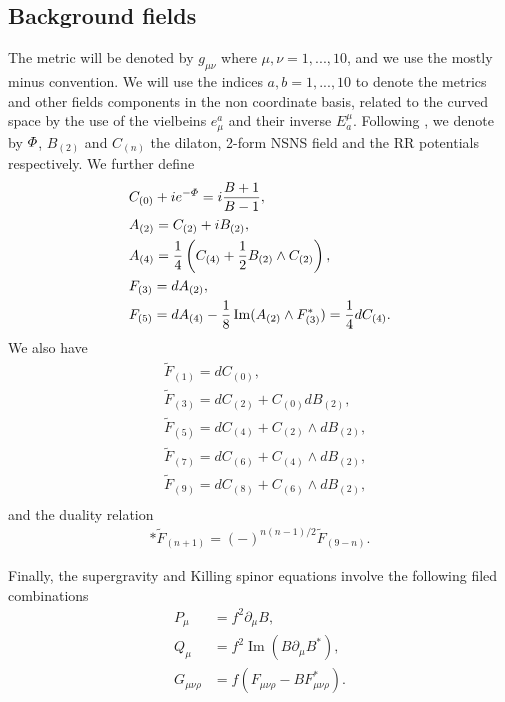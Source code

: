 \documentclass[11pt]{article}
\let\oldPhi=\Phi
\renewcommand{\Phi}{\mathnormal{\oldPhi}}
\renewcommand{\Im}{\mathop{\mathrm{Im}}}
\newcommand{\sfrac}[2]{{\textstyle\frac{#1}{#2}}}
\newcommand{\p}{\partial}\newcommand{\quarter}{\sfrac{1}{4}}
\begin{document}
\subsection{Background fields}
The metric will be denoted by $g_{\mu \nu}$ where $\mu,\nu = 1,...,10$, and we use the mostly minus convention.
We will use the indices $a,b=1,...,10$ to denote the metrics and other fields components in the non coordinate basis, related to the curved space by the use of the vielbeins $e_\mu^a$ and their inverse $E_a^\mu$.
Following \cite{Buchel:2000cn}, we denote by $\Phi$, $B_{(2)}$ and $C_{(n)}$ the dilaton, 2-form NSNS field and the RR potentials respectively.
We further define
\begin{align}\label{eq:defs1}
&C_{(0)} + i e^{-\Phi} = i\frac{B+1}{B-1},\nonumber\\
&A_{(2)} = C_{(2)} + i B_{(2)},\nonumber\\
&A_{(4)} = \frac{1}{4}\left(C_{(4)} + \frac{1}{2}B_{(2)}\wedge C_{(2)}\right),\nonumber\\
&F_{(3)} = d A_{(2)},\nonumber\\
&F_{(5)} = d A_{(4)} - \frac{1}{8} \Im (A_{(2)}\wedge F_{(3)}^*) = \frac{1}{4} d C_{(4)}.
\end{align}
We also have
\begin{align}\label{eq:defs2}
&\tilde F_{(1)} = d C_{(0)},\nonumber\\
&\tilde F_{(3)} = d C_{(2)} + C_{(0)} d B_{(2)},\nonumber\\
&\tilde F_{(5)} = d C_{(4)} + C_{(2)} \wedge d B_{(2)},\nonumber\\
&\tilde F_{(7)} = d C_{(6)} + C_{(4)} \wedge d B_{(2)},\nonumber\\
&\tilde F_{(9)} = d C_{(8)} + C_{(6)} \wedge d B_{(2)},\nonumber\\
\end{align}
and the duality relation
\begin{align}\label{eq:dualityconstraint}
\ast \tilde F_{(n+1)} =(-)^{n(n-1)/2} \tilde F_{(9-n)}.
\end{align}

Finally, the supergravity and Killing spinor equations involve the following filed combinations
\begin{align}\label{eq:defs3}
P_\mu & = f^2 \p_\mu B,\nonumber\\
Q_\mu & = f^2 \Im(B \p_\mu B^*),\nonumber\\
G_{\mu \nu \rho} & = f\left(F_{\mu \nu \rho} - B F_{\mu \nu \rho}^*\right).
\end{align}
\end{document}
